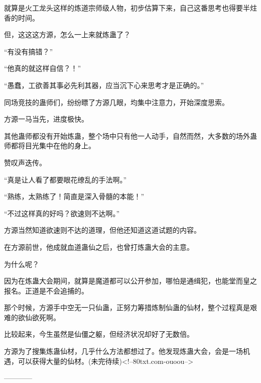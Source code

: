 \begin{this_body}
就算是火工龙头这样的炼道宗师级人物，初步估算下来，自己这番思考也得要半炷香的时间。

但，这这这方源，怎么一上来就炼蛊了？

“有没有搞错？”

“他真的就这样自信？！”

“愚蠢，工欲善其事必先利其器，应当沉下心来思考才是正确的。”

同场竞技的蛊师们，纷纷瞟了方源几眼，均集中注意力，开始深度思索。

方源一马当先，进度极快。

其他蛊师都没有开始炼蛊，整个场中只有他一人动手，自然而然，大多数的场外蛊师都将目光集中在他的身上。

赞叹声迭传。

“真是让人看了都要眼花缭乱的手法啊。”

“熟练，太熟练了！简直是深入骨髓的本能！”

“不过这样真的好吗？欲速则不达啊。”

方源当然知道欲速则不达的道理，但他还知道这道试题的内容。

在方源前世，他成就血道蛊仙之后，也曾打炼蛊大会的主意。

为什么呢？

因为在炼蛊大会期间，就算是魔道都可以公开参加，哪怕是通缉犯，也能堂而皇之报名。正道是不会追捕的。

那个时候，方源手中空无一只仙蛊，正努力筹措炼制仙蛊的仙材，整个过程真是艰难的欲仙欲死啊。

比较起来，今生虽然是仙僵之躯，但经济状况却好了无数倍。

方源为了搜集炼蛊仙材，几乎什么方法都想过了。他发现炼蛊大会，会是一场机遇，可以获得大量的仙材。(未完待续)<!--80txt.com-ouoou-->

------------

\end{this_body}

